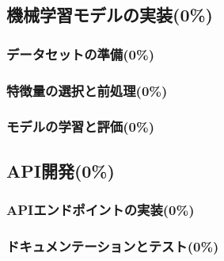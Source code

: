   \subsection{機械学習モデルの実装(0\%)}
    \label{sec:機械学習モデルの実装}
      \par 
      
      \subsubsection{データセットの準備(0\%)}
        \label{sec:データセットの準備}
          \par
          
      \subsubsection{特徴量の選択と前処理(0\%)}
        \label{sec:特徴量の選択と前処理}
          \par
          
      \subsubsection{モデルの学習と評価(0\%)}
        \label{sec:モデルの学習と評価}
          \par
          
  \subsection{API開発(0\%)}
    \label{sec:API開発}
      \par
      
      \subsubsection{APIエンドポイントの実装(0\%)}
        \label{sec:APIエンドポイントの実装}
          \par
          
      \subsubsection{ドキュメンテーションとテスト(0\%)}
        \label{sec:ドキュメンテーションとテスト}
          \par
